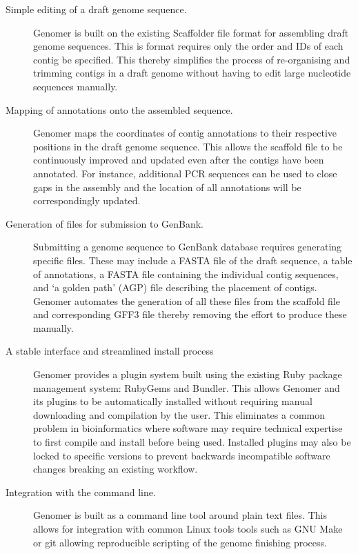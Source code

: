 \documentclass[10pt]{article}
\begin{document}
\begin{description} 

  \item[Simple editing of a draft genome sequence.]{Genomer is built on the
  existing Scaffolder \cite{barton2012} file format for assembling draft genome
  sequences. This is format requires only the order and IDs of each contig be
  specified. This thereby simplifies the process of re-organising and trimming
  contigs in a draft genome without having to edit large nucleotide sequences
  manually.}

  \item[Mapping of annotations onto the assembled sequence.]{Genomer maps the
  coordinates of contig annotations to their respective positions in the draft
  genome sequence. This allows the scaffold file to be continuously improved
  and updated even after the contigs have been annotated. For instance,
  additional PCR sequences can be used to close gaps in the assembly and the
  location of all annotations will be correspondingly updated.}

  \item[Generation of files for submission to GenBank.]{Submitting a genome
  sequence to GenBank database requires generating specific files. These may
  include a FASTA file of the draft sequence, a table of annotations, a FASTA
  file containing the individual contig sequences, and `a golden path' (AGP)
  \cite{agp-spec} file describing the placement of contigs. Genomer automates
  the generation of all these files from the scaffold file and corresponding
  GFF3 file thereby removing the effort to produce these manually.}

  \item[A stable interface and streamlined install process]{Genomer provides a
  plugin system built using the existing Ruby package management system:
  RubyGems and Bundler. This allows Genomer and its plugins to be automatically
  installed without requiring manual downloading and compilation by the user.
  This eliminates a common problem in bioinformatics where software may require
  technical expertise to first compile and install before being used. Installed
  plugins may also be locked to specific versions to prevent backwards
  incompatible software changes breaking an existing workflow.}

  \item[Integration with the command line.]{Genomer is built as a command line
  tool around plain text files. This allows for integration with common Linux
  tools tools such as GNU Make or git allowing reproducible scripting of the
  genome finishing process.}

\end{description}
\end{document}
